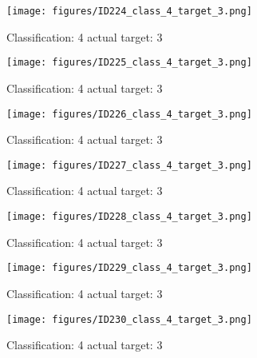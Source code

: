 \begin{figure}[h!]
\begin{center}
\texttt{[image: figures/ID224\_class\_4\_target\_3.png]}
\end{center}
\caption{ Classification: 4 actual target: 3}
\label{fig:ID224_class_4_target_3}
\end{figure}
\begin{figure}[h!]
\begin{center}
\texttt{[image: figures/ID225\_class\_4\_target\_3.png]}
\end{center}
\caption{ Classification: 4 actual target: 3}
\label{fig:ID225_class_4_target_3}
\end{figure}
\begin{figure}[h!]
\begin{center}
\texttt{[image: figures/ID226\_class\_4\_target\_3.png]}
\end{center}
\caption{ Classification: 4 actual target: 3}
\label{fig:ID226_class_4_target_3}
\end{figure}
\begin{figure}[h!]
\begin{center}
\texttt{[image: figures/ID227\_class\_4\_target\_3.png]}
\end{center}
\caption{ Classification: 4 actual target: 3}
\label{fig:ID227_class_4_target_3}
\end{figure}
\begin{figure}[h!]
\begin{center}
\texttt{[image: figures/ID228\_class\_4\_target\_3.png]}
\end{center}
\caption{ Classification: 4 actual target: 3}
\label{fig:ID228_class_4_target_3}
\end{figure}
\begin{figure}[h!]
\begin{center}
\texttt{[image: figures/ID229\_class\_4\_target\_3.png]}
\end{center}
\caption{ Classification: 4 actual target: 3}
\label{fig:ID229_class_4_target_3}
\end{figure}
\begin{figure}[h!]
\begin{center}
\texttt{[image: figures/ID230\_class\_4\_target\_3.png]}
\end{center}
\caption{ Classification: 4 actual target: 3}
\label{fig:ID230_class_4_target_3}
\end{figure}
